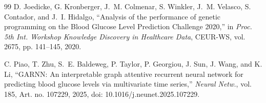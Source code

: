 \documentclass[journal]{IEEEtran}
\begin{document}
\begin{thebibliography}{99}
\label{ref70label} D. Joedicke, G. Kronberger, J.~M. Colmenar, S. Winkler, J.~M. Velasco, S. Contador, and J.~I. Hidalgo, ``Analysis of the performance of genetic programming on the Blood Glucose Level Prediction Challenge 2020,'' in \emph{Proc. 5th Int. Workshop Knowledge Discovery in Healthcare Data}, CEUR-WS, vol. 2675, pp. 141--145, 2020.

\label{ref75label} C. Piao, T. Zhu, S.~E. Baldeweg, P. Taylor, P. Georgiou, J. Sun, J. Wang, and K. Li, ``GARNN: An interpretable graph attentive recurrent neural network for predicting blood glucose levels via multivariate time series,'' \emph{Neural Netw.}, vol. 185, Art. no. 107229, 2025, doi: 10.1016/j.neunet.2025.107229.

\end{thebibliography}
\end{document}
